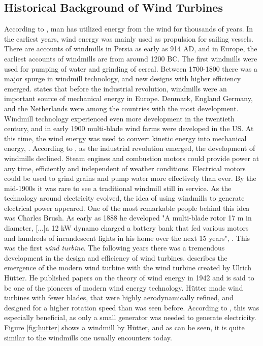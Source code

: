 \subsection{Historical Background of Wind Turbines}
According to \cite{Wagner2013}, man has utilized energy from the wind for thousands of years. In the earliest years, wind energy was mainly used as propulsion for sailing vessels. There are accounts of windmills in Persia as early as 914 AD, and in Europe, the earliest accounts of windmills are from around 1200 BC. The first windmills were used for pumping of water and grinding of cereal. Between 1700-1800 there was a major spurge in windmill technology, and new designs with higher efficiency emerged. \cite{Lynn2011} states that before the industrial revolution, windmills were an important source of mechanical energy in Europe. Denmark, England Germany, and the Netherlands were among the countries with the most development. Windmill technology experienced even more development in the twentieth century, and in early 1900 multi-blade wind farms were developed in the US. At this time, the wind energy was used to convert kinetic energy into mechanical energy, \cite{Hau2013}. According to \cite{Lynn2011}, as the industrial revolution emerged, the development of windmills declined. Steam engines and combustion motors could provide power at any time, efficiently and independent of weather conditions. Electrical motors could be used to grind grains and pump water more effectively than ever. By the mid-1900s it was rare to see a traditional windmill still in service. \newline 
\newline
As the technology around electricity evolved, the idea of using windmills to generate electrical power appeared. One of the most remarkable people behind this idea was Charles Brush. As early as 1888 he developed "A multi-blade rotor 17 m in diameter, [...]a 12 kW dynamo charged a battery bank that fed various motors and hundreds of incandescent lights in his home over the next 15 years", \cite{Lynn2011}. This was the first \textit{wind turbine}. The following years there was a tremendous development in the design and efficiency of wind turbines. \cite{Hau2013} describes the emergence of the modern wind turbine with the wind turbine created by Ulrich Hütter. He published papers on the theory of wind energy in 1942 and is said to be one of the pioneers of modern wind energy technology. Hütter made wind turbines with fewer blades, that were highly aerodynamically refined, and designed for a higher rotation speed than was seen before. According to \cite{Wagner2013}, this was especially beneficial, as only a small generator was needed to generate electricity. Figure \ref{fig:hutter} shows a windmill by Hütter, and as can be seen, it is quite similar to the windmills one usually encounters today. \newline
\newline

